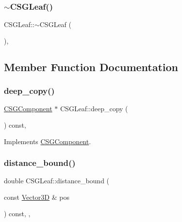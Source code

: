 \mbox{\label{classCSGLeaf_ae6814ea82f8bdaa79eb0c98f25d6334b}} 
\subsubsection{\texorpdfstring{$\sim$CSGLeaf()}{~CSGLeaf()}}
{\footnotesize\ttfamily C\+S\+G\+Leaf\+::$\sim$\+C\+S\+G\+Leaf (\begin{DoxyParamCaption}{ }\end{DoxyParamCaption})\hspace{0.3cm}{\ttfamily [override]}, {\ttfamily [default]}}



\subsection{Member Function Documentation}
\mbox{\label{classCSGLeaf_aa5142f7259d9a5d4e38797346bb6e640}} 
\subsubsection{\texorpdfstring{deep\_copy()}{deep\_copy()}}
{\footnotesize\ttfamily \mbox{\hyperlink{classCSGComponent}{C\+S\+G\+Component}} $\ast$ C\+S\+G\+Leaf\+::deep\+\_\+copy (\begin{DoxyParamCaption}{ }\end{DoxyParamCaption}) const\hspace{0.3cm}{\ttfamily [override]}, {\ttfamily [virtual]}}



Implements \mbox{\hyperlink{classCSGComponent_a98d3accd23c28259cbf490f4d7acbe83}{C\+S\+G\+Component}}.

\mbox{\label{classCSGLeaf_a78d00f0c35cd87b222da10fb728037eb}} 
\subsubsection{\texorpdfstring{distance\_bound()}{distance\_bound()}}
{\footnotesize\ttfamily double C\+S\+G\+Leaf\+::distance\+\_\+bound (\begin{DoxyParamCaption}\item[{const \mbox{\hyperlink{classVector3D}{Vector3D}} \&}]{pos }\end{DoxyParamCaption}) const\hspace{0.3cm}{\ttfamily [inline]}, {\ttfamily [override]}, {\ttfamily [virtual]}}



